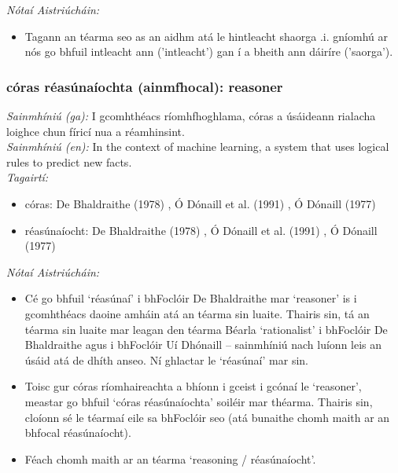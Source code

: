\documentclass{article}
\begin{document}
 \noindent \textit{Nótaí Aistriúcháin:}
\begin{itemize}
	\item Tagann an téarma seo as an aidhm atá le hintleacht shaorga .i. gníomhú ar nós go bhfuil intleacht ann ('intleacht') gan í a bheith ann dáiríre ('saorga').
\end{itemize}


\subsubsection*{córas réasúnaíochta (ainmfhocal): reasoner}
 \noindent \textit{Sainmhíniú (ga):} I gcomhthéacs ríomhfhoghlama, córas a úsáideann rialacha loighce chun fíricí nua a réamhinsint.
\\
 \noindent \textit{Sainmhíniú (en):} In the context of machine learning, a system that uses logical rules to predict new facts.
\\
 \noindent \textit{Tagairtí:}
\begin{itemize}
	\item córas: De Bhaldraithe (1978) \cite{de-bhaldraithe}, Ó Dónaill et al. (1991) \cite{focloir-beag}, Ó Dónaill (1977) \cite{odonaill}
	\item réasúnaíocht: De Bhaldraithe (1978) \cite{de-bhaldraithe}, Ó Dónaill et al. (1991) \cite{focloir-beag}, Ó Dónaill (1977) \cite{odonaill}
\end{itemize}

 \noindent \textit{Nótaí Aistriúcháin:}
\begin{itemize}
	\item Cé go bhfuil `réasúnaí' i bhFoclóir De Bhaldraithe mar `reasoner' is i gcomhthéacs daoine amháin atá an téarma sin luaite. Thairis sin, tá an téarma sin luaite mar leagan den téarma Béarla `rationalist' i bhFoclóir De Bhaldraithe agus i bhFoclóir Uí Dhónaill -- sainmhíniú nach luíonn leis an úsáid atá de dhíth anseo. Ní ghlactar le `réasúnaí' mar sin.
	\item Toisc gur córas ríomhaireachta a bhíonn i gceist i gcónaí le `reasoner', meastar go bhfuil `córas réasúnaíochta' soiléir mar théarma. Thairis sin, cloíonn sé le téarmaí eile sa bhFoclóir seo (atá bunaithe chomh maith ar an bhfocal réasúnaíocht).
	\item Féach chomh maith ar an téarma `reasoning / réasúnaíocht'.
\end{itemize}
\end{document}
